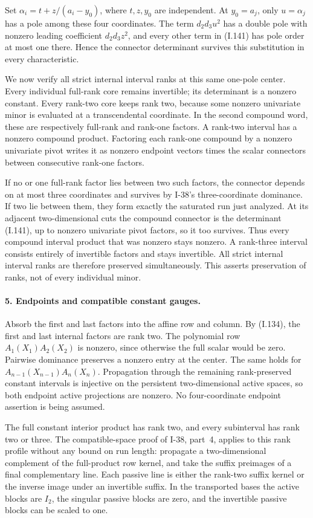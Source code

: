 Set $\alpha_i=t+z/(a_i-y_0)$, where $t,z,y_0$ are independent.
At $y_0=a_j$, only $u=\alpha_j$ has a pole among these four
coordinates. The term $d_2d_3u^2$ has a double pole with nonzero
leading coefficient $d_2d_3z^2$, and every other term in
(I.141) has pole order at most one there. Hence the connector
determinant survives this substitution in every characteristic.

We now verify all strict internal interval ranks at this same
one-pole center. Every individual full-rank core remains
invertible; its determinant is a nonzero constant. Every
rank-two core keeps rank two, because some nonzero univariate
minor is evaluated at a transcendental coordinate. In the
second compound word, these are respectively full-rank and
rank-one factors. A rank-two interval has a nonzero compound
product. Factoring each rank-one compound by a nonzero
univariate pivot writes it as nonzero endpoint vectors times
the scalar connectors between consecutive rank-one factors.

If no or one full-rank factor lies between two such factors,
the connector depends on at most three coordinates and survives
by I-38's three-coordinate dominance. If two lie between them,
they form exactly the saturated run just analyzed. At its
adjacent two-dimensional cuts the compound connector is the
determinant (I.141), up to nonzero univariate pivot factors,
so it too survives. Thus every compound interval product that
was nonzero stays nonzero. A rank-three interval consists
entirely of invertible factors and stays invertible. All
strict internal interval ranks are therefore preserved
simultaneously. This asserts preservation of ranks, not of
every individual minor.

\paragraph{5. Endpoints and compatible constant gauges.}
Absorb the first and last factors into the affine row and column.
By (I.134), the first and last internal factors are rank two.
The polynomial row $A_1(X_1)A_2(X_2)$ is nonzero, since otherwise
the full scalar would be zero. Pairwise dominance preserves a
nonzero entry at the center. The same holds for
$A_{n-1}(X_{n-1})A_n(X_n)$. Propagation through the remaining
rank-preserved constant intervals is injective on the persistent
two-dimensional active spaces, so both endpoint active
projections are nonzero. No four-coordinate endpoint assertion
is being assumed.

The full constant interior product has rank two, and every
subinterval has rank two or three. The compatible-space proof
of I-38, part~4, applies to this rank profile without any bound
on run length: propagate a two-dimensional complement of the
full-product row kernel, and take the suffix preimages of a
final complementary line. Each passive line is either the
rank-two suffix kernel or the inverse image under an invertible
suffix. In the transported bases the active blocks are
$I_2$, the singular passive blocks are zero, and the invertible
passive blocks can be scaled to one.


